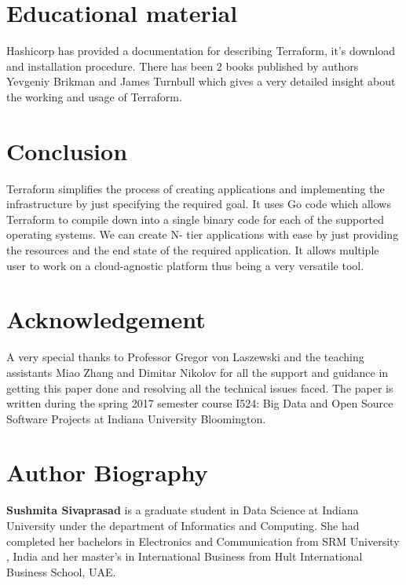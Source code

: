 \documentclass[9pt,twocolumn,twoside]{../../styles/osajnl}
\begin{document}
\section{Educational material}

Hashicorp has provided a documentation for describing Terraform, it's
download and installation procedure. There has been 2 books published
by authors Yevgeniy Brikman\cite{www-terraform-upandrunning} and James
Turnbull\cite{www-terraform-book} which gives a very detailed insight
about the working and usage of Terraform.

\section{Conclusion}

Terraform simplifies the process of creating applications and
implementing the infrastructure by just specifying the required
goal. It uses Go code which allows Terraform to compile down into a
single binary code for each of the supported operating systems. We can
create N- tier applications with ease by just providing the resources
and the end state of the required application. It allows multiple user
to work on a cloud-agnostic platform thus being a very versatile tool.

\section{Acknowledgement}

A very special thanks to Professor Gregor von Laszewski and the
teaching assistants Miao Zhang and Dimitar Nikolov for all the support
and guidance in getting this paper done and resolving all the
technical issues faced. The paper is written during the spring 2017
semester course {I524: Big Data and Open Source Software Projects} at
Indiana University Bloomington.


\section{Author Biography}

\textbf{Sushmita Sivaprasad} is a graduate student in Data Science at
Indiana University under the department of Informatics and
Computing. She had completed her bachelors in Electronics and
Communication from SRM University , India and her master's in
International Business from Hult International Business School, UAE.


\end{document}

